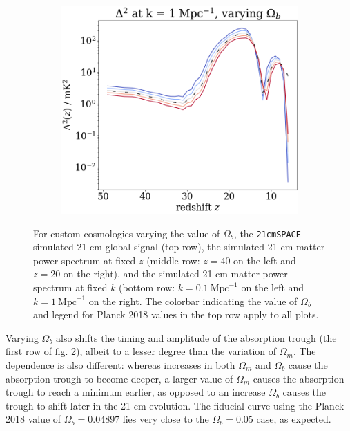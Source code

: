 \documentclass[floats,floatfix,showpacs,amssymb,prd,superscriptaddress,nofootinbib]{revtex4-2} %
\newcommand{\code}{\texttt}
\begin{document}
\begin{figure}[H]
\begin{subfigure}[b]{0.45\textwidth}
     \end{subfigure}
     \hfill
     \begin{subfigure}[b]{0.45\textwidth}
         \centering
         \includegraphics[width=\textwidth]{images/simulation_results/power_spectrum_fixed_k_1_Ob.png}
         \label{fig:power_spectrum_fixed_k_1_Ob}
     \end{subfigure}
        \caption{For custom cosmologies varying the value of $\Omega_b$, the \code{21cmSPACE} simulated 21-cm global signal (top row), the simulated 21-cm matter power spectrum at fixed $z$ (middle row: $z = 40$ on the left and $z = 20$ on the right), and the simulated 21-cm matter power spectrum at fixed $k$ (bottom row: $k = 0.1 ~\text{Mpc}^{-1}$ on the left and $k = 1 ~\text{Mpc}^{-1}$ on the right. The colorbar indicating the value of $\Omega_b$ and legend for Planck 2018 values in the top row apply to all plots.}
        \label{fig:simulation_results_Ob}
\end{figure}

Varying $\Omega_b$ also shifts the timing and amplitude of the absorption trough (the first row of fig. \ref{fig:simulation_results_Ob}), albeit to a lesser degree than the variation of $\Omega_m$. The dependence is also different: whereas increases in both $\Omega_m$ and $\Omega_b$ cause the absorption trough to become deeper, a larger value of $\Omega_m$ causes the absorption trough to reach a minimum earlier, as opposed to an increase $\Omega_b$ causes the trough to shift later in the 21-cm evolution. The fiducial curve using the  Planck 2018 value of $\Omega_b = 0.04897$ lies very close to the $\Omega_b = 0.05$ case, as expected.
\end{document}
